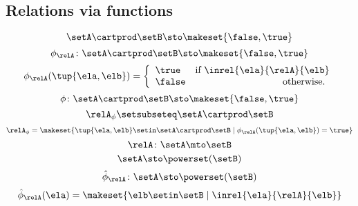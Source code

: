 \begin{forslides}
\subsection{Relations via functions}

\begin{equation}\label{eq:slides_session2_110}
\setA \cartprod \setB \sto \makeset{ \false, \true }
\end{equation}
 \begin{equation}\label{eq:slides_session2_111}
\phi_{\relA} \colon \setA \cartprod \setB \sto \makeset{ \false, \true }
\end{equation}
\begin{equation}\label{eq:slides_session2_112}
\phi_{\relA}(\tup{\ela, \elb}) =
              \left\{\begin{array}{lr}
                  \true  & \text{if } \inrel{\ela}{\relA}{\elb} \\
                  \false & \text{otherwise.
                  }
              \end{array}
              \right.
\end{equation}
 \begin{equation}\label{eq:slides_session2_113}
\phi\colon \setA \cartprod \setB \sto \makeset{ \false, \true }
\end{equation}
\begin{equation}\label{eq:slides_session2_114}
\relA_{\phi} \setsubseteq \setA \cartprod \setB
\end{equation}
 \begin{equation}\label{eq:slides_session2_115}
\relA_{\phi} = \makeset{ \tup{\ela, \elb} \setin \setA \cartprod \setB \mid \phi_{\relA}(\tup{\ela, \elb}) = \true }
\end{equation}
\begin{equation}\label{eq:slides_session2_116}
\relA \colon \setA \mto \setB
\end{equation}
 \begin{equation}\label{eq:slides_session2_117}
\setA  \sto \powerset (\setB)
\end{equation}
\begin{equation}\label{eq:slides_session2_118}
\hat \phi_{\relA} \colon \setA \sto \powerset (\setB)
\end{equation}
 \begin{equation}\label{eq:slides_session2_119}
\hat \phi_{\relA} (\ela) = \makeset{ \elb \setin \setB \mid \inrel{\ela}{\relA}{\elb}}
\end{equation}
\begin{equation}\label{eq:slides_session2_120}

\end{equation}
\end{forslides}
